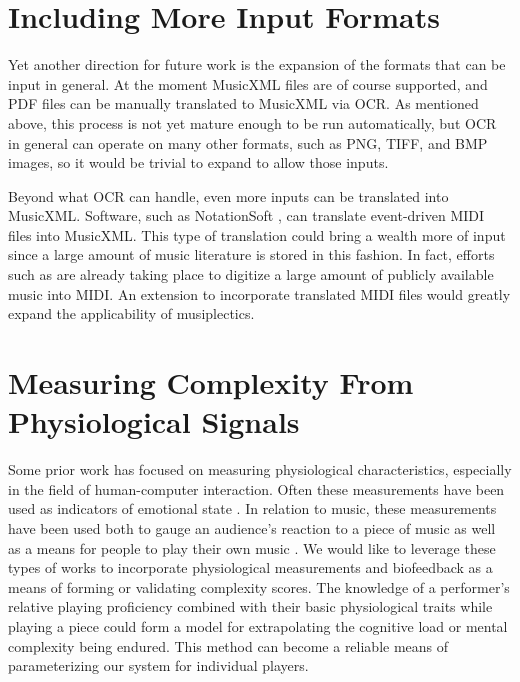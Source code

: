 \documentclass[12pt]{report}
\begin{document}

\section{Including More Input Formats}
\label{sec:input}

Yet another direction for future work is the expansion of the formats that can be input in general. At the moment MusicXML files are of course supported, and PDF files can be manually translated to MusicXML via OCR. As mentioned above, this process is not yet mature enough to be run automatically, but OCR in general can operate on many other formats, such as PNG, TIFF, and BMP images, so it would be trivial to expand to allow those inputs.

Beyond what OCR can handle, even more inputs can be translated into MusicXML. Software, such as NotationSoft \cite{NotationSoft}, can translate event-driven MIDI files into MusicXML. This type of translation could bring a wealth more of input since a large amount of music literature is stored in this fashion. In fact, efforts such as \cite{Choudhury2000} are already taking place to digitize a large amount of publicly available music into MIDI. An extension to incorporate translated MIDI files would greatly expand the applicability of musiplectics.

\section{Measuring Complexity From Physiological Signals}
\label{sec:physio}

Some prior work has focused on measuring physiological characteristics, especially in the field of human-computer interaction. Often these measurements have been used as indicators of emotional state \cite{Physio}. In relation to music, these measurements have been used both to gauge an audience's reaction to a piece of music as well as a means for people to play their own music \cite{Controller} \cite{Tanaka2002}. We would like to leverage these types of works to incorporate physiological measurements and biofeedback as a means of forming or validating complexity scores. The knowledge of a performer's relative playing proficiency combined with their basic physiological traits while playing a piece could form a model for extrapolating the cognitive load or mental complexity being endured. This method can become a reliable means of parameterizing our system for individual players.
\end{document}
